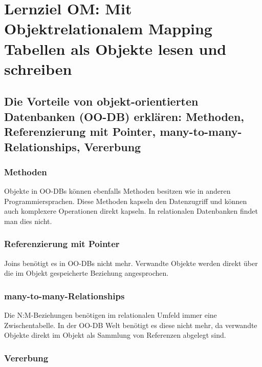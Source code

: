 \section{Lernziel OM: Mit Objektrelationalem Mapping Tabellen als Objekte lesen und schreiben}

\subsection{Die Vorteile von objekt-orientierten Datenbanken (OO-DB) erklären: Methoden, Referenzierung mit Pointer, many-to-many-Relationships, Vererbung}

\subsubsection{Methoden}
Objekte in OO-DBs können ebenfalls Methoden besitzen wie in anderen Programmiersprachen. Diese Methoden kapseln den Datenzugriff und können auch komplexere Operationen direkt kapseln. In relationalen Datenbanken findet man dies nicht.

\subsubsection{Referenzierung mit Pointer}
Joins benötigt es in OO-DBs nicht mehr. Verwandte Objekte werden direkt über die im Objekt gespeicherte Beziehung angesprochen.

\subsubsection{many-to-many-Relationships}
Die N:M-Beziehungen benötigen im relationalen Umfeld immer eine Zwischentabelle. In der OO-DB Welt benötigt es diese nicht mehr, da verwandte Objekte direkt im Objekt als Sammlung von Referenzen abgelegt sind.

\subsubsection{Vererbung}

